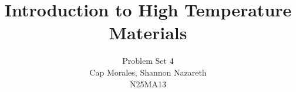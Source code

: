 \documentclass[12pt]{article}
\begin{document}
 

\title{Introduction to High Temperature Materials}
\author{Problem Set 4\\
Cap Morales, Shannon Nazareth\\
N25MA13}

\maketitle







%
\clearpage



\end{document}
